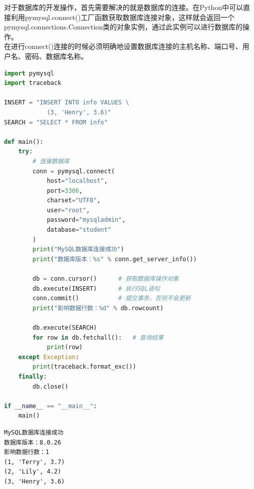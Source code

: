对于数据库的开发操作，首先需要解决的就是数据库的连接。在Python中可以直接利用pymysql.connect()工厂函数获取数据库连接对象，这样就会返回一个pymysql.connections.Connection类的对象实例，通过此实例可以进行数据库的操作。\\

在进行connect()连接的时候必须明确地设置数据库连接的主机名称、端口号、用户名、密码、数据库名称。\\


\begin{lstlisting}[language=Python]
import pymysql
import traceback

INSERT = "INSERT INTO info VALUES \
            (3, 'Henry', 3.6)"
SEARCH = "SELECT * FROM info"

def main():
    try:
        # 连接数据库
        conn = pymysql.connect(
            host="localhost",
            port=3306,
            charset="UTF8",
            user="root",
            password="mysqladmin",
            database="student"
        )
        print("MySQL数据库连接成功")
        print("数据库版本：%s" % conn.get_server_info())

        db = conn.cursor()      # 获取数据库操作对象
        db.execute(INSERT)      # 执行SQL语句
        conn.commit()           # 提交事务，否则不会更新
        print("影响数据行数：%d" % db.rowcount)

        db.execute(SEARCH)
        for row in db.fetchall():   # 查询结果
            print(row)
    except Exception:
        print(traceback.format_exc())
    finally:
        db.close()

if __name__ == "__main__":
    main()
\end{lstlisting}

\begin{tcolorbox}
	\begin{verbatim}
MySQL数据库连接成功
数据库版本：8.0.26
影响数据行数：1
(1, 'Terry', 3.7)
(2, 'Lily', 4.2)
(3, 'Henry', 3.6)
\end{verbatim}
\end{tcolorbox}

\newpage